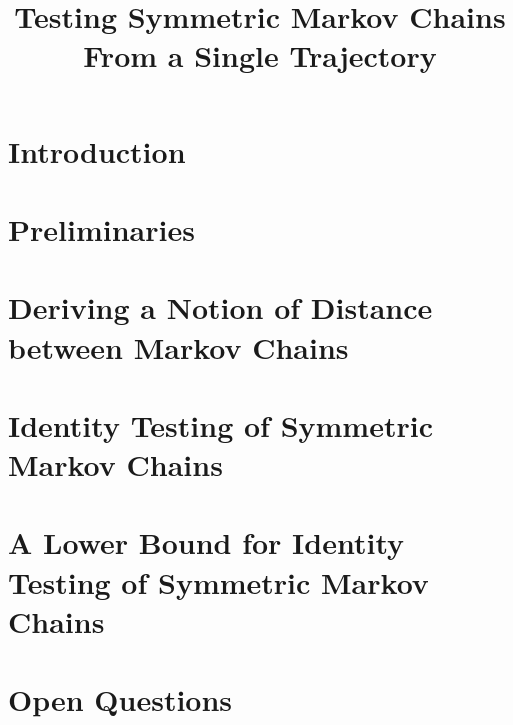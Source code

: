 \documentclass[final,12pt]{colt2018}
\title{Testing Symmetric Markov Chains From a Single Trajectory}
\begin{document}

\maketitle




\thispagestyle{empty}
\addtocounter{page}{-1}
\newpage
\section{Introduction}
\label{sec:intro}


%

\section{Preliminaries}
\label{sec:prelim}


%

\section{Deriving a Notion of Distance between Markov Chains}
\label{sec:distance}


\section{Identity Testing of Symmetric Markov Chains}
\label{sec:symmetric}

%

\section{A Lower Bound for Identity Testing of Symmetric Markov Chains}
\label{sec:symmetric_lb}



\section{Open Questions}
\label{sec:open}

\end{document}

